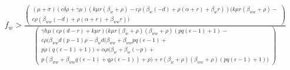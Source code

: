 \documentclass[11pt]{article}
\begin{document}
\begin{align}
	f_w > \frac{\begin{pmatrix}
			(\mu +\sigma ) (c \delta  \rho +\gamma  \mu ) (k \mu  r (\beta_w+\rho )-c \rho  (\beta_w (-d)+\rho  (\alpha +r)+\beta_w r)) (k \mu  r (\beta_{ww}+\rho )- \\
			c \rho  (\beta_{ww} (-d)+\rho  (\alpha +r)+\beta_{ww} r))
		\end{pmatrix}}{\begin{pmatrix}
		\gamma  h \mu  (c \rho  (d-r)+k \mu  r) (k \mu  r (\beta_w+\rho ) (\beta_{ww}+\rho ) (p q (\epsilon -1)+1) - \\ 
		c \rho  (\beta_{ww} d (p-1) \rho -\beta_w d (\beta_{ww} + \beta_{ww} p q (\epsilon -1) + \\
		p \rho  (q (\epsilon -1)+1))+\alpha  \rho  (\beta_w+\beta_w (-p)+ \\ 
		p (\beta_{ww}+\beta_{ww} q (\epsilon -1)+q \rho  (\epsilon -1))+\rho )+r (\beta_w+\rho ) (\beta_{ww}+\rho ) (p q (\epsilon -1)+1))
	\end{pmatrix}}
\end{align}
\end{document}
